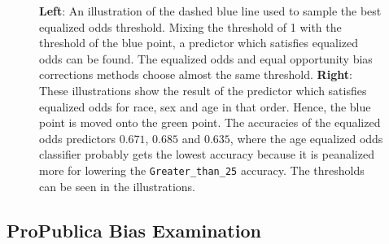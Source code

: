 \documentclass[11pt, fleqn, titlepage]{article}
\begin{document}
\begin{figure}[H]
\begin{subfigure}{0.5\textwidth}
		\end{subfigure}
		\caption{\textbf{Left}: An illustration of the dashed blue line used to sample the best equalized odds threshold. Mixing the threshold of 1 with the threshold of the blue point, a predictor which satisfies equalized odds can be found. The equalized odds and equal opportunity bias corrections methods choose almost the same threshold.  \textbf{Right}: These illustrations show the result of the predictor which satisfies equalized odds for race, sex and age in that order. Hence, the blue point is moved onto the green point. The accuracies of the equalized odds predictors $0.671$, $0.685$ and $0.635$, where the age equalized odds classifier probably gets the lowest accuracy because it is peanalized more for lowering the \texttt{Greater\_than\_{25}} accuracy. The thresholds can be seen in the illustrations.}
		\label{fig:equalizedOdds}
	\end{figure}
	
	\subsection{ProPublica Bias Examination}\label{propub}
	
\end{document}

